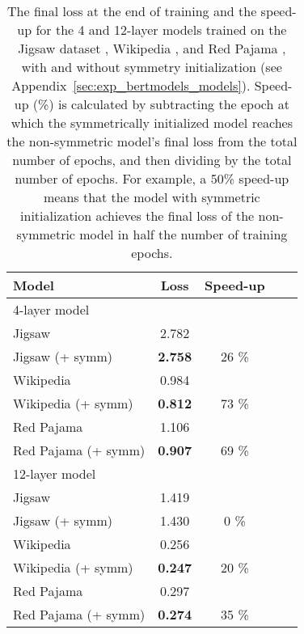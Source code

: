 \begin{table}[t]
\caption{The final loss at the end of training and the speed-up for the 4 and 12-layer models trained on the Jigsaw dataset \citep{jigsaw_challenge}, Wikipedia \citep{wikidump}, and Red Pajama \citep{together2023redpajama}, with and without symmetry initialization (see Appendix~\ref{sec:exp_bertmodels_models}).
%
Speed-up (\%) is calculated by subtracting the epoch at which the symmetrically initialized model reaches the non-symmetric model’s final loss from the total number of epochs, and then dividing by the total number of epochs.
%
For example, a 50\% speed-up means that the model with symmetric initialization achieves the final loss of the non-symmetric model in half the number of training epochs.
%
}
\label{table:symmetric-initialization}
\vskip 0.15in
\begin{center}
\begin{small}
\begin{sc}
\begin{tabular}{lcccr}
\toprule
Model & Loss & Speed-up \\
\midrule\midrule
4-layer model & & \\
\midrule\midrule
Jigsaw & 2.782 & \\
Jigsaw (+ symm) & \textbf{2.758} & 26 \% \\
\midrule
Wikipedia & 0.984& \\
Wikipedia (+ symm) & \textbf{0.812} & 73 \%\\
\midrule
Red Pajama & 1.106 &\\
Red Pajama (+ symm) & \textbf{0.907} & 69 \%\\
\midrule\midrule
12-layer model & & \\
\midrule\midrule
Jigsaw & 1.419 & \\
Jigsaw (+ symm) & 1.430 & 0 \%\\
\midrule
Wikipedia & 0.256 & \\
Wikipedia (+ symm) & \textbf{0.247} & 20 \%\\
\midrule
Red Pajama & 0.297&\\
Red Pajama (+ symm) & \textbf{0.274} & 35 \%\\
\bottomrule
\end{tabular}
\end{sc}
\end{small}
\end{center}
\vskip -0.1in
\end{table}